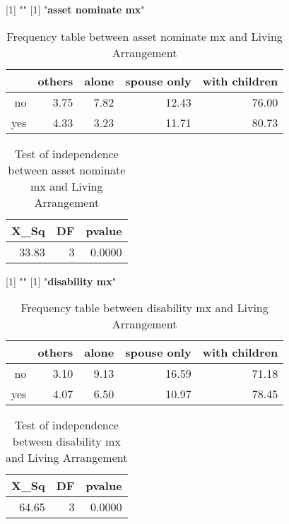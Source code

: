 \documentclass[11pt]{article}
\begin{document}
[1] "\newline"
[1] "{\bf{asset nominate mx}}"
\begin{table}[H]
\centering
\begin{tabular}{rrrrr}
  \hline
 & others & alone & spouse only & with children \\ 
  \hline
no & 3.75 & 7.82 & 12.43 & 76.00 \\ 
  yes & 4.33 & 3.23 & 11.71 & 80.73 \\ 
   \hline
\end{tabular}
\caption{Frequency table between asset nominate mx and Living Arrangement} 
\end{table}
\begin{table}[H]
\centering
\begin{tabular}{rrr}
  \hline
X\_Sq & DF & pvalue \\ 
  \hline
33.83 & 3 & 0.0000 \\ 
   \hline
\end{tabular}
\caption{Test of independence between asset nominate mx and Living Arrangement} 
\end{table}
[1] "\newline"
[1] "{\bf{disability mx}}"
\begin{table}[H]
\centering
\begin{tabular}{rrrrr}
  \hline
 & others & alone & spouse only & with children \\ 
  \hline
no & 3.10 & 9.13 & 16.59 & 71.18 \\ 
  yes & 4.07 & 6.50 & 10.97 & 78.45 \\ 
   \hline
\end{tabular}
\caption{Frequency table between disability mx and Living Arrangement} 
\end{table}
\begin{table}[H]
\centering
\begin{tabular}{rrr}
  \hline
X\_Sq & DF & pvalue \\ 
  \hline
64.65 & 3 & 0.0000 \\ 
   \hline
\end{tabular}
\caption{Test of independence between disability mx and Living Arrangement} 
\end{table}
\end{document}
